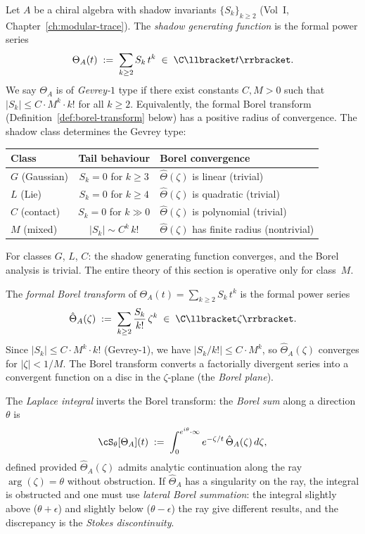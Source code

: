 \begin{definition}
\label{def:shadow-generating-gevrey}
Let $A$ be a chiral algebra with shadow invariants $\{S_k\}_{k \geq 2}$ (Vol~I, Chapter~\ref{ch:modular-trace}). The \emph{shadow generating function} is the formal power series
\[
 \Theta_A(t) \;:=\; \sum_{k \geq 2} S_k\, t^k \;\in\; \C\llbracket t \rrbracket.
\]
We say $\Theta_A$ is of \emph{Gevrey-$1$} type if there exist constants $C, M > 0$ such that $|S_k| \leq C \cdot M^k \cdot k!$ for all $k \geq 2$. Equivalently, the formal Borel transform (Definition~\ref{def:borel-transform} below) has a positive radius of convergence. The shadow class determines the Gevrey type:
\begin{center}
\renewcommand{\arraystretch}{1.15}
\begin{tabular}{lcl}
\toprule
\textbf{Class} & \textbf{Tail behaviour} & \textbf{Borel convergence} \\
\midrule
$G$ (Gaussian) & $S_k = 0$ for $k \geq 3$ & $\hat{\Theta}(\zeta)$ is linear (trivial) \\
$L$ (Lie) & $S_k = 0$ for $k \geq 4$ & $\hat{\Theta}(\zeta)$ is quadratic (trivial) \\
$C$ (contact) & $S_k = 0$ for $k \gg 0$ & $\hat{\Theta}(\zeta)$ is polynomial (trivial) \\
$M$ (mixed) & $|S_k| \sim C^k\, k!$ & $\hat{\Theta}(\zeta)$ has finite radius (nontrivial) \\
\bottomrule
\end{tabular}
\end{center}
For classes $G$, $L$, $C$: the shadow generating function converges, and the Borel analysis is trivial. The entire theory of this section is operative only for class~$M$.
\end{definition}

\begin{definition}
\label{def:borel-transform}
The \emph{formal Borel transform} of $\Theta_A(t) = \sum_{k \geq 2} S_k\, t^k$ is the formal power series
\[
 \hat{\Theta}_A(\zeta) \;:=\; \sum_{k \geq 2} \frac{S_k}{k!}\, \zeta^k \;\in\; \C\llbracket \zeta \rrbracket.
\]
Since $|S_k| \leq C \cdot M^k \cdot k!$ (Gevrey-$1$), we have $|S_k / k!| \leq C \cdot M^k$, so $\hat{\Theta}_A(\zeta)$ converges for $|\zeta| < 1/M$. The Borel transform converts a factorially divergent series into a convergent function on a disc in the $\zeta$-plane (the \emph{Borel plane}).

The \emph{Laplace integral} inverts the Borel transform: the \emph{Borel sum} along a direction $\theta$ is
\[
 \cS_\theta[\Theta_A](t) \;:=\; \int_0^{e^{i\theta} \cdot \infty} e^{-\zeta/t}\, \hat{\Theta}_A(\zeta)\, d\zeta,
\]
defined provided $\hat{\Theta}_A(\zeta)$ admits analytic continuation along the ray $\arg(\zeta) = \theta$ without obstruction. If $\hat{\Theta}_A$ has a singularity on the ray, the integral is obstructed and one must use \emph{lateral Borel summation}: the integral slightly above ($\theta + \epsilon$) and slightly below ($\theta - \epsilon$) the ray give different results, and the discrepancy is the \emph{Stokes discontinuity}.
\end{definition}

